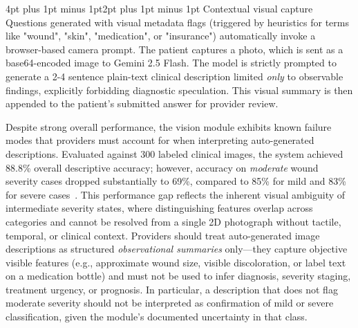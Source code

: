 \documentclass[sigplan,screen]{acmart}
\makeatletter
\renewcommand{\subsection}{\@startsection{subsection}{2}{\z@}
  {4pt plus 1pt minus 1pt}{2pt plus 1pt minus 1pt}
  {\normalfont\normalsize\bfseries}}
\makeatother
\begin{document}
\subsection{Contextual visual capture}
Questions generated with visual metadata flags (triggered by heuristics for terms like "wound", "skin", "medication", or "insurance") automatically invoke a browser-based camera prompt. The patient captures a photo, which is sent as a base64-encoded image to Gemini 2.5 Flash. The model is strictly prompted to generate a 2-4 sentence plain-text clinical description limited \textit{only} to observable findings, explicitly forbidding diagnostic speculation. This visual summary is then appended to the patient's submitted answer for provider review.

Despite strong overall performance, the vision module exhibits known failure
modes that providers must account for when interpreting auto-generated
descriptions. Evaluated against 300 labeled clinical images, the system
achieved 88.8\% overall descriptive accuracy; however, accuracy on
\textit{moderate} wound severity cases dropped substantially to 69\%,
compared to 85\% for mild and 83\% for severe cases~\cite{wounddataset}.
This performance gap reflects the inherent visual ambiguity of intermediate
severity states, where distinguishing features overlap across categories and
cannot be resolved from a single 2D photograph without tactile, temporal,
or clinical context. Providers should treat auto-generated image descriptions
as structured \textit{observational summaries} only---they capture objective
visible features (e.g., approximate wound size, visible discoloration, or
label text on a medication bottle) and must not be used to infer diagnosis,
severity staging, treatment urgency, or prognosis. In particular, a
description that does not flag moderate severity should not be interpreted
as confirmation of mild or severe classification, given the module's
documented uncertainty in that class.
\end{document}
